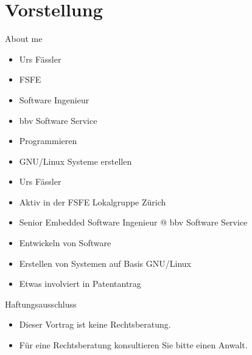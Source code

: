 \section{Vorstellung}
\begin{frame}{About me}
	\begin{itemize}
		\item Urs Fässler
		\item FSFE
		\item Software Ingenieur
		\item bbv Software Service
		\item Programmieren
		\item GNU/Linux Systeme erstellen
	\end{itemize}
\end{frame}
\note
{
	\begin{itemize}
		\item Urs Fässler
		\item Aktiv in der FSFE Lokalgruppe Zürich
		\item Senior Embedded Software Ingenieur @ bbv Software Service
		\item Entwickeln von Software
		\item Erstellen von Systemen auf Basis GNU/Linux
		\item Etwas involviert in Patentantrag
	\end{itemize}
}

\begin{frame}{Haftungsausschluss}
	\begin{itemize}
		\item Dieser Vortrag ist keine Rechtsberatung.
		\item Für eine Rechtsberatung konsultieren Sie bitte einen Anwalt.
	\end{itemize}
\end{frame}
